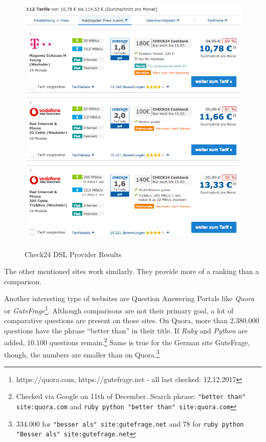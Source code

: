 \begin{figure}[h]
\includegraphics[width=1\textwidth,scale=0.8]{images/ds-sys/check24_2}
\label{img:check24_2}
\caption{Check24 DSL Provider Results}
\end{figure}

The other mentioned sites work similarly. They provide more of a ranking than a comparison.\newline


Another interesting type of websites are Question Answering Portals like \emph{Quora} or \emph{GuteFrage}\footnote{https://quora.com, https://gutefrage.net - all last checked: 12.12.2017}. Although comparisons are not their primary goal, a lot of comparative questions are present on those sites.
On Quora, more than 2.380.000 questions have the phrase \enquote{better than} in their title. If \emph{Ruby} and \emph{Python} are added, 10.100 questions remain.\footnote{Checked via Google on 11th of December. Search phrase: \texttt{"better than" site:quora.com} and \texttt{ruby python "better than" site:quora.com}}
Same is true for the German site GuteFrage, though, the numbers are smaller than on Quora.\footnote{334.000 for \texttt{"besser als" site:gutefrage.net} and 78 for \texttt{ruby python "Besser als" site:gutefrage.net}}\newline

